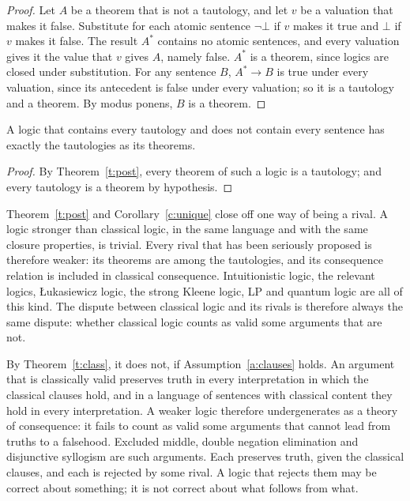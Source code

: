 \documentclass{situationist-preprint}
\begin{document}
\begin{proof}
Let $A$ be a theorem that is not a tautology, and let $v$ be a valuation that makes it false. Substitute for each atomic sentence $\neg\bot$ if $v$ makes it true and $\bot$ if $v$ makes it false. The result $A^*$ contains no atomic sentences, and every valuation gives it the value that $v$ gives $A$, namely false. $A^*$ is a theorem, since logics are closed under substitution. For any sentence $B$, $A^* \to B$ is true under every valuation, since its antecedent is false under every valuation; so it is a tautology and a theorem. By modus ponens, $B$ is a theorem.
\end{proof}

\begin{corollary}\label{c:unique}
A logic that contains every tautology and does not contain every sentence has exactly the tautologies as its theorems.
\end{corollary}

\begin{proof}
By Theorem~\ref{t:post}, every theorem of such a logic is a tautology; and every tautology is a theorem by hypothesis.
\end{proof}

Theorem~\ref{t:post} and Corollary~\ref{c:unique} close off one way of being a rival. A logic stronger than classical logic, in the same language and with the same closure properties, is trivial. Every rival that has been seriously proposed is therefore weaker: its theorems are among the tautologies, and its consequence relation is included in classical consequence. Intuitionistic logic, the relevant logics, Łukasiewicz logic, the strong Kleene logic, LP and quantum logic are all of this kind. The dispute between classical logic and its rivals is therefore always the same dispute: whether classical logic counts as valid some arguments that are not.

By Theorem~\ref{t:class}, it does not, if Assumption~\ref{a:clauses} holds. An argument that is classically valid preserves truth in every interpretation in which the classical clauses hold, and in a language of sentences with classical content they hold in every interpretation. A weaker logic therefore undergenerates as a theory of consequence: it fails to count as valid some arguments that cannot lead from truths to a falsehood. Excluded middle, double negation elimination and disjunctive syllogism are such arguments. Each preserves truth, given the classical clauses, and each is rejected by some rival. A logic that rejects them may be correct about something; it is not correct about what follows from what.
\end{document}
